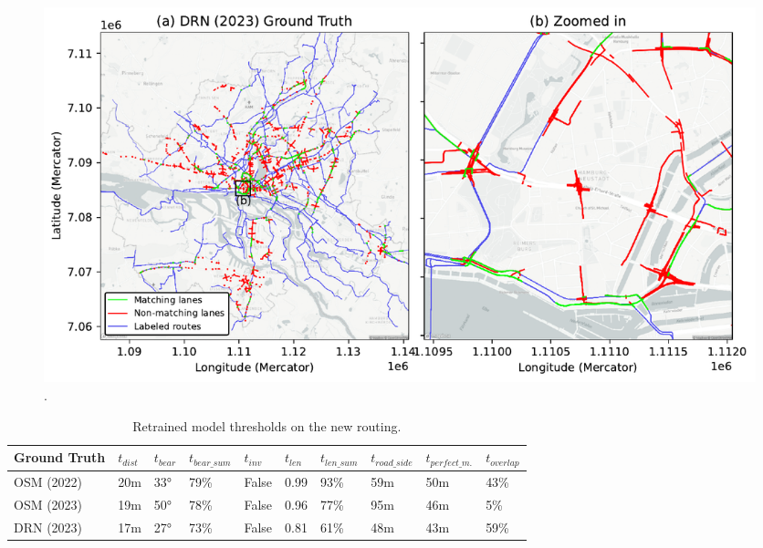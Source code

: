 \begin{figure}[htbp]
\centering 
\includegraphics[width=\linewidth]{images/matching-ground-truth-drn.pdf}
\caption{.}
\label{fig:}
\end{figure}

\begin{table}[h]
\caption{Retrained model thresholds on the new routing.}
\begin{tabular}{@{}llllllllll@{}}
\toprule
  \textbf{Ground Truth} & $t_{dist}$ & $t_{bear}$ & $t_{bear\_sum}$ & $t_{inv}$ & $t_{len}$ & $t_{len\_sum}$ & $t_{road\_side}$ &  $t_{perfect\_m.}$ & $t_{overlap}$ \\
  \midrule
  OSM (2022) & 20m & 33° & 79\% & False & 0.99 & 93\% & 59m & 50m & 43\% \\
  OSM (2023) & 19m & 50° & 78\% & False & 0.96 & 77\% & 95m & 46m & 5\% \\
  DRN (2023) & 17m & 27° & 73\% & False & 0.81 & 61\% & 48m & 43m & 59\% \\
\bottomrule
\end{tabular}
\label{tab:hyperparameter-tuning-results-drn}
\end{table}

